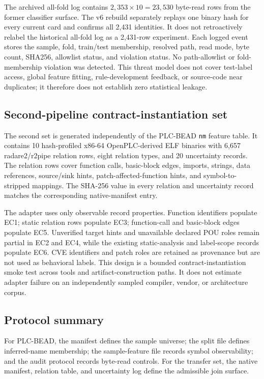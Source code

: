 \documentclass[manuscript,screen,review]{acmart}
\begin{document}
The archived all-fold log contains $2{,}353 \times 10=23{,}530$ byte-read rows from the former classifier surface. The v6 rebuild separately replays one binary hash for every current card and confirms all 2{,}431 identities. It does not retroactively relabel the historical all-fold log as a 2{,}431-row experiment. Each logged event stores the sample, fold, train/test membership, resolved path, read mode, byte count, SHA256, allowlist status, and violation status. No path-allowlist or fold-membership violation was detected. This threat model does not cover test-label access, global feature fitting, rule-development feedback, or source-code near duplicates; it therefore does not establish zero statistical leakage.

\subsection{Second-pipeline contract-instantiation set}

The second set is generated independently of the PLC-BEAD \texttt{nm} feature table. It contains 10 hash-profiled x86-64 OpenPLC-derived ELF binaries with 6{,}657 radare2/r2pipe relation rows, eight relation types, and 20 uncertainty records. The relation rows cover function calls, basic-block edges, imports, strings, data references, source/sink hints, patch-affected-function hints, and symbol-to-stripped mappings. The SHA-256 value in every relation and uncertainty record matches the corresponding native-manifest entry.

The adapter uses only observable record properties. Function identifiers populate EC1; static relation rows populate EC3; function-call and basic-block edges populate EC5. Unverified target hints and unavailable declared POU roles remain partial in EC2 and EC4, while the existing static-analysis and label-scope records populate EC6. CVE identifiers and patch roles are retained as provenance but are not used as behavioral labels. This design is a bounded contract-instantiation smoke test across tools and artifact-construction paths. It does not estimate adapter failure on an independently sampled compiler, vendor, or architecture corpus.

\subsection{Protocol summary}

For PLC-BEAD, the manifest defines the sample universe; the split file defines inferred-name membership; the sample-feature file records symbol observability; and the audit protocol records byte-read controls. For the transfer set, the native manifest, relation table, and uncertainty log define the admissible join surface.
\end{document}
